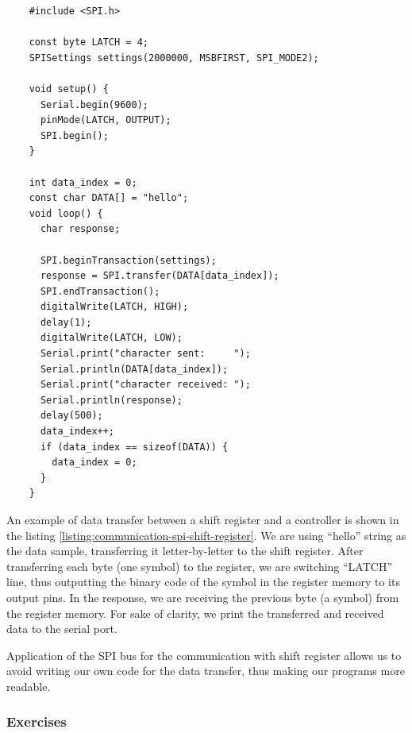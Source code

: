 \documentclass[../sparc.tex]{subfiles}
\begin{document}
\begin{listing}[ht]
  \begin{verbatim}
    #include <SPI.h>

    const byte LATCH = 4;
    SPISettings settings(2000000, MSBFIRST, SPI_MODE2);

    void setup() {
      Serial.begin(9600);
      pinMode(LATCH, OUTPUT);
      SPI.begin();
    }

    int data_index = 0;
    const char DATA[] = "hello";
    void loop() {
      char response;

      SPI.beginTransaction(settings);
      response = SPI.transfer(DATA[data_index]);
      SPI.endTransaction();
      digitalWrite(LATCH, HIGH);
      delay(1);
      digitalWrite(LATCH, LOW);
      Serial.print("character sent:     ");
      Serial.println(DATA[data_index]);
      Serial.print("character received: ");
      Serial.println(response);
      delay(500);
      data_index++;
      if (data_index == sizeof(DATA)) {
        data_index = 0;
      }
    }
  \end{verbatim}
  \label{listing:communication-spi-shift-register}
  \caption{An example of communication with a shift register using the SPI bus.}
\end{listing}

An example of data transfer between a shift register and a controller is shown
in the listing \ref{listing:communication-spi-shift-register}.  We are using
``hello'' string as the data sample, transferring it letter-by-letter to the
shift register.  After transferring each byte (one symbol) to the register, we
are switching ``LATCH'' line, thus outputting the binary code of the symbol in
the register memory to its output pins.  In the response, we are receiving the
previous byte (a symbol) from the register memory.  For sake of clarity, we
print the transferred and received data to the serial port.

Application of the SPI bus for the communication with shift register allows us
to avoid writing our own code for the data transfer, thus making our programs
more readable.

\subsubsection{Exercises}
\end{document}
